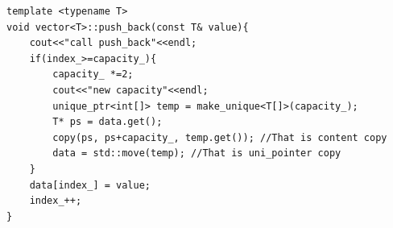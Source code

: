 \documentclass[a4paper,11pt,twoside]{book}
\begin{document}
\begin{lstlisting}[numbers=none]
template <typename T>
void vector<T>::push_back(const T& value){
	cout<<"call push_back"<<endl;
	if(index_>=capacity_){
		capacity_ *=2;
		cout<<"new capacity"<<endl;
		unique_ptr<int[]> temp = make_unique<T[]>(capacity_);
		T* ps = data.get();
		copy(ps, ps+capacity_, temp.get()); //That is content copy
		data = std::move(temp); //That is uni_pointer copy
	}
	data[index_] = value;
	index_++;
}			
\end{lstlisting}	
	
%	
%	
%		
	
	
%
%
%
\end{document}
